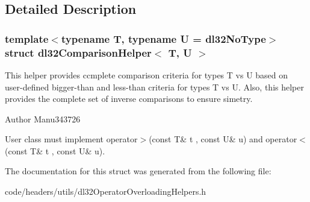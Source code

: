 \subsection{Detailed Description}
\subsubsection*{template$<$typename T, typename U = dl32\-No\-Type$>$struct dl32\-Comparison\-Helper$<$ T, U $>$}

This helper provides ccmplete comparison criteria for types T vs U based on user-\/defined bigger-\/than and less-\/than criteria for types T vs U. Also, this helper provides the complete set of inverse comparisons to ensure simetry. 

\begin{DoxyAuthor}{Author}
Manu343726
\end{DoxyAuthor}
User class must implement operator$>$(const T\& t , const U\& u) and operator$<$(const T\& t , const U\& u). 

The documentation for this struct was generated from the following file\-:\begin{DoxyCompactItemize}
\item 
code/headers/utils/dl32\-Operator\-Overloading\-Helpers.\-h\end{DoxyCompactItemize}
